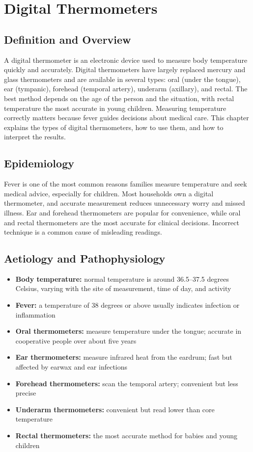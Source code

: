 \chapter{Digital Thermometers}

\section*{Definition and Overview}
A digital thermometer is an electronic device used to measure body temperature quickly and accurately. Digital thermometers have largely replaced mercury and glass thermometers and are available in several types: oral (under the tongue), ear (tympanic), forehead (temporal artery), underarm (axillary), and rectal. The best method depends on the age of the person and the situation, with rectal temperature the most accurate in young children. Measuring temperature correctly matters because fever guides decisions about medical care. This chapter explains the types of digital thermometers, how to use them, and how to interpret the results.

\section*{Epidemiology}
Fever is one of the most common reasons families measure temperature and seek medical advice, especially for children. Most households own a digital thermometer, and accurate measurement reduces unnecessary worry and missed illness. Ear and forehead thermometers are popular for convenience, while oral and rectal thermometers are the most accurate for clinical decisions. Incorrect technique is a common cause of misleading readings.

\section*{Aetiology and Pathophysiology}
\begin{itemize}
    \item \textbf{Body temperature:} normal temperature is around 36.5--37.5 degrees Celsius, varying with the site of measurement, time of day, and activity
    \item \textbf{Fever:} a temperature of 38 degrees or above usually indicates infection or inflammation
    \item \textbf{Oral thermometers:} measure temperature under the tongue; accurate in cooperative people over about five years
    \item \textbf{Ear thermometers:} measure infrared heat from the eardrum; fast but affected by earwax and ear infections
    \item \textbf{Forehead thermometers:} scan the temporal artery; convenient but less precise
    \item \textbf{Underarm thermometers:} convenient but read lower than core temperature
    \item \textbf{Rectal thermometers:} the most accurate method for babies and young children
\end{itemize}

